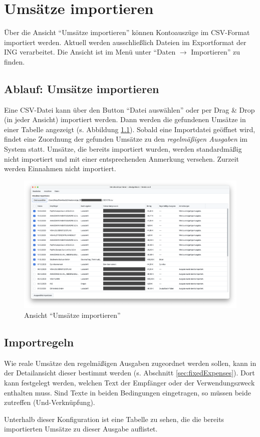 \chapter{Umsätze importieren}

Über die Ansicht "`Umsätze importieren"' können Kontoauszüge im CSV-Format importiert werden. Aktuell werden ausschließlich Dateien im Exportformat der ING verarbeitet. Die Ansicht ist im Menü unter "`Daten $\rightarrow$ Importieren"' zu finden.

\section{Ablauf: Umsätze importieren}

Eine CSV-Datei kann über den Button "`Datei auswählen"' oder per Drag & Drop (in jeder Ansicht) importiert werden. Dann werden die gefundenen Umsätze in einer Tabelle angezeigt (s. Abbildung \ref{fig:ImportView}). Sobald eine Importdatei geöffnet wird, findet eine Zuordnung der gefunden Umsätze zu den \textit{regelmäßigen Ausgaben} im System statt. Umsätze, die bereits importiert wurden, werden standardmäßig nicht importiert und mit einer entsprechenden Anmerkung versehen. Zurzeit werden Einnahmen nicht importiert.

\begin{figure}[h!]
	\centering
	\includegraphics[width=\textwidth]{img/Screenshot-ImportView}
	\vspace{-2em}
	\caption{Ansicht "`Umsätze importieren"'}
	\label{fig:ImportView}
\end{figure}

\section{Importregeln}

Wie reale Umsätze den regelmäßigen Ausgaben zugeordnet werden sollen, kann in der Detailansicht dieser bestimmt werden (s. Abschnitt \ref{sec:fixedExpenses}). Dort kann festgelegt werden, welchen Text der Empfänger oder der Verwendungszweck enthalten muss. Sind Texte in beiden Bedingungen eingetragen, so müssen beide zutreffen (Und-Verknüpfung). 

Unterhalb dieser Konfiguration ist eine Tabelle zu sehen, die die bereits importierten Umsätze zu dieser Ausgabe auflistet. 